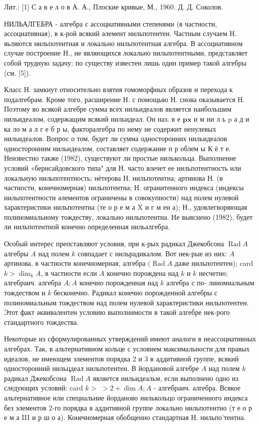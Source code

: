 \documentclass[10pt]{article}
\begin{document}
Лит.: [1] С а в е л о в А. А., Плоские кривые, М., 1960. Д. Д. Соколов.



НИЛЬАЛГЕБРА - алгебра с ассоциативными степенями (в частности, ассоциативная), в к-рой всякий әлемент нильпотентен. Частным случаем Н. яьляются нильпотентная и локально нильпотентная алгебра. В ассоциативном случае построение Н., не являющихся локально нильпотентными, представляет собой трудную задачу; по существу известен лишь один пример такой алгебры (см. [5]).



Класс Н. замкнут относительно взятия гомоморфных образов и перехода к подалгебрам. Кроме того, расширение Н. с помощыю Н. снова оказывается Н. Поэтому во всякой алгебре сумма всех нильидеалов является наибольшим нильидеалом, содержащим всякий нильидеал. Он наз. в е $\mathbf{p} \mathbf{x}$ и м ни л ь $\mathrm{p}$ а д и ка ло м а л г е б р ы, факторалгебра по нему не содержит ненулевых нильидеалов. Вопрос о том, будет ли сумма односторонних нильидеалов односторонним нильидеалом, составляет содержание п р облем ы К ё т е. Неизвестно также (1982), существуют ли простые нилькольца. Выполнение условий «бернсайдовского типа" для Н. часто влечет ее нильпотентность или локальную нильпотентность; нётерова Н. нильпотентна; артинова Н. (в частности, конечномерная) нильпотентна; Н. огранитенного индекса (индексы нильпотентности әлементов ограничены в совокупности) над полем нулевой характеристики нильпотентна (те о р е м а X и г м ен а); Н., удовлегворяющая полиномиальному тождеству, локально нильпотентна. Не выяснено (1982), будет ли нильпотентной конечно определенная нильалгебра.



Особый интерес препставляют условия, при к-рых радикал Джекобсона $\operatorname{Rad} A$ алгебры $A$ над полем $k$ совпадает с нильрадикалом. Вот нек-рые из них: $A$ артинова, в частности конечномерная, алгебра $(\operatorname{Rad} A$ даже нильпотентен); card $k>\operatorname{dim}_{k} A$, в частности если $A$ конечно порождена над $k$ и $k$ несчетно; алгебраич. алгебра $A ; A$ конечно порожденная над $k$ алгебра с по- линомиальным тождеством и $k$ бесконечно. Радикал конечно порожденной алгебры с полиномиальным тождеством над полем нулевой характеристики нильпотентен. Этот факт әквивалентен условию выполнимости в такой алгебре нек-рого стандартного тождества.



Некоторые из сформулированных утверждений имеют аналоги в неассоциативных алгебрах. Так, в альтернативном кольце с условием максимальности для правых идеалов, не имеющем элементов порядка 2 и 3 в аддитивной группе, всякий односторонний нильцдеал нильпотентен. В йордановой алгебре $A$ над полем $k$ радикал Джекобсона $\operatorname{Rad} A$ является нильидеальм, если выполнено одно из следующих условий: card $k>$ $>2+\operatorname{dim} A ; A$ - алгебраич. алгебра. Всякое альтернативное или специальние йорданово нилькольцо ограниченного индекса без элементов 2-го порядка в аддитивной группе локально нильпотентно (т е о р е м а III и р ш о а). Конечномерная обобщенно стандартная Н. нильпо'тентна.
\end{document}

